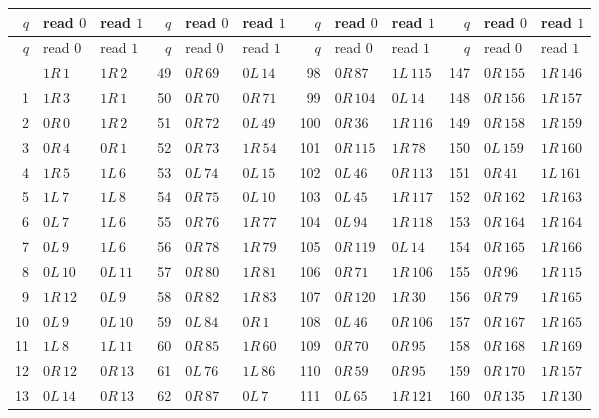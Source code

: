 \begingroup
\small
\setlength{\tabcolsep}{4pt}
\renewcommand{\arraystretch}{1.0}
\begin{longtable}{rll@{\quad}rll@{\quad}rll@{\quad}rll}
\toprule
$q$ & read $0$ & read $1$ & $q$ & read $0$ & read $1$ & $q$ & read $0$ & read $1$ & $q$ & read $0$ & read $1$\\
\midrule\endfirsthead
\toprule
$q$ & read $0$ & read $1$ & $q$ & read $0$ & read $1$ & $q$ & read $0$ & read $1$ & $q$ & read $0$ & read $1$\\
\midrule\endhead
\bottomrule\endfoot
0 & $1R\,1$ & $1R\,2$ & 49 & $0R\,69$ & $0L\,14$ & 98 & $0R\,87$ & $1L\,115$ & 147 & $0R\,155$ & $1R\,146$\\
1 & $1R\,3$ & $1R\,1$ & 50 & $0R\,70$ & $0R\,71$ & 99 & $0R\,104$ & $0L\,14$ & 148 & $0R\,156$ & $1R\,157$\\
2 & $0R\,0$ & $1R\,2$ & 51 & $0R\,72$ & $0L\,49$ & 100 & $0R\,36$ & $1R\,116$ & 149 & $0R\,158$ & $1R\,159$\\
3 & $0R\,4$ & $0R\,1$ & 52 & $0R\,73$ & $1R\,54$ & 101 & $0R\,115$ & $1R\,78$ & 150 & $0L\,159$ & $1R\,160$\\
4 & $1R\,5$ & $1L\,6$ & 53 & $0L\,74$ & $0L\,15$ & 102 & $0L\,46$ & $0R\,113$ & 151 & $0R\,41$ & $1L\,161$\\
5 & $1L\,7$ & $1L\,8$ & 54 & $0R\,75$ & $0L\,10$ & 103 & $0L\,45$ & $1R\,117$ & 152 & $0R\,162$ & $1R\,163$\\
6 & $0L\,7$ & $1L\,6$ & 55 & $0R\,76$ & $1R\,77$ & 104 & $0L\,94$ & $1R\,118$ & 153 & $0R\,164$ & $1R\,164$\\
7 & $0L\,9$ & $1L\,6$ & 56 & $0R\,78$ & $1R\,79$ & 105 & $0R\,119$ & $0L\,14$ & 154 & $0R\,165$ & $1R\,166$\\
8 & $0L\,10$ & $0L\,11$ & 57 & $0R\,80$ & $1R\,81$ & 106 & $0R\,71$ & $1R\,106$ & 155 & $0R\,96$ & $1R\,115$\\
9 & $1R\,12$ & $0L\,9$ & 58 & $0R\,82$ & $1R\,83$ & 107 & $0R\,120$ & $1R\,30$ & 156 & $0R\,79$ & $1R\,165$\\
10 & $0L\,9$ & $0L\,10$ & 59 & $0L\,84$ & $0R\,1$ & 108 & $0L\,46$ & $0R\,106$ & 157 & $0R\,167$ & $1R\,165$\\
11 & $1L\,8$ & $1L\,11$ & 60 & $0R\,85$ & $1R\,60$ & 109 & $0R\,70$ & $0R\,95$ & 158 & $0R\,168$ & $1R\,169$\\
12 & $0R\,12$ & $0R\,13$ & 61 & $0L\,76$ & $1L\,86$ & 110 & $0R\,59$ & $0R\,95$ & 159 & $0R\,170$ & $1R\,157$\\
13 & $0L\,14$ & $0R\,13$ & 62 & $0R\,87$ & $0L\,7$ & 111 & $0L\,65$ & $1R\,121$ & 160 & $0R\,135$ & $1R\,130$\\

\end{longtable}
